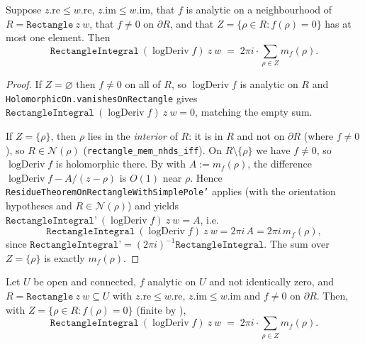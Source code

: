 \begin{lemma}
\label{lem:ap_one_zero}
\leanok
{}
Suppose $z.\mathrm{re}\le w.\mathrm{re}$, $z.\mathrm{im}\le w.\mathrm{im}$, that $f$
is analytic on a neighbourhood of $R=\texttt{Rectangle}\ z\ w$, that $f\neq0$ on
$\partial R$, and that $Z=\{\rho\in R:f(\rho)=0\}$ has at most one element. Then
\[
  \texttt{RectangleIntegral}\ (\operatorname{logDeriv} f)\ z\ w
  \;=\; 2\pi i \cdot \sum_{\rho\in Z} m_f(\rho).
\]
\end{lemma}

\begin{proof}
\leanok
{}
If $Z=\varnothing$ then $f\neq0$ on all of $R$, so $\operatorname{logDeriv} f$ is
analytic on $R$ and \texttt{HolomorphicOn.vanishesOnRectangle} gives
$\texttt{RectangleIntegral}\ (\operatorname{logDeriv} f)\ z\ w=0$, matching the empty
sum.

If $Z=\{\rho\}$, then $\rho$ lies in the \emph{interior} of $R$: it is in $R$ and not
on $\partial R$ (where $f\neq0$), so $R\in\mathcal N(\rho)$
(\texttt{rectangle\_mem\_nhds\_iff}). On $R\setminus\{\rho\}$ we have $f\neq0$, so
$\operatorname{logDeriv} f$ is holomorphic there. By 
with $A:=m_f(\rho)$, the difference $\operatorname{logDeriv} f-A/(z-\rho)$ is $O(1)$
near $\rho$. Hence \texttt{ResidueTheoremOnRectangleWithSimplePole'} applies (with the
orientation hypotheses and $R\in\mathcal N(\rho)$) and yields
$\texttt{RectangleIntegral'}\ (\operatorname{logDeriv} f)\ z\ w = A$, i.e.
\[
  \texttt{RectangleIntegral}\ (\operatorname{logDeriv} f)\ z\ w
  = 2\pi i\,A = 2\pi i\,m_f(\rho),
\]
since $\texttt{RectangleIntegral'}=(2\pi i)^{-1}\texttt{RectangleIntegral}$. The sum
over $Z=\{\rho\}$ is exactly $m_f(\rho)$.
\end{proof}

\begin{theorem}
\label{thm:ap_residue_sum}
\leanok
{}
Let $U$ be open and connected, $f$ analytic on $U$ and not identically zero, and
$R=\texttt{Rectangle}\ z\ w\subseteq U$ with $z.\mathrm{re}\le w.\mathrm{re}$,
$z.\mathrm{im}\le w.\mathrm{im}$ and $f\neq0$ on $\partial R$. Then, with
$Z=\{\rho\in R:f(\rho)=0\}$ (finite by ),
\[
  \texttt{RectangleIntegral}\ (\operatorname{logDeriv} f)\ z\ w
  \;=\; 2\pi i \cdot \sum_{\rho\in Z} m_f(\rho).
\]
\end{theorem}

